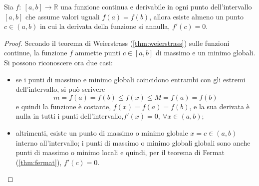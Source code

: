 \begin{theorem}\label{thm:rolle} Sia $f: \ [a,b] \rightarrow \mathbb{R}$ una funzione continua e derivabile in ogni punto dell'intervallo $[a,b]$ che assume valori uguali $f(a) = f(b)$, allora esiste almeno un punto $c \in (a,b)$ in cui la derivata della funzione si annulla, $f'(c) = 0$.
\end{theorem}
\begin{proof}
    Secondo il teorema di Weierstrass (\ref{thm:weierstrass}) sulle funzioni continue, la funzione $f$ ammette punti $c \in [a,b]$ di massimo e un minimo globali. Si possono riconoscere ora due casi:
    \begin{itemize}
        \item se i punti di massimo e minimo globali coincidono entrambi con gli estremi dell'intervallo, si può scrivere
            \begin{equation} m = f(a) = f(b) \le f(x) \le M = f(a) = f(b) \end{equation}
                e quindi la funzione è costante, $f(x) = f(a) = f(b)$, e la sua derivata è nulla in tutti i punti dell'intervallo,$f'(x) = 0, \ \forall x \in (a,b)$;
            \item altrimenti, esiste un punto di massimo o minimo globale $x=c \in (a,b)$ interno all'intervallo; i punti di massimo o minimo globali globali sono anche punti di massimo o minimo locali e quindi, per il teorema di Fermat (\ref{thm:fermat}), $f'(c) = 0$.
    \end{itemize} 
\end{proof}

